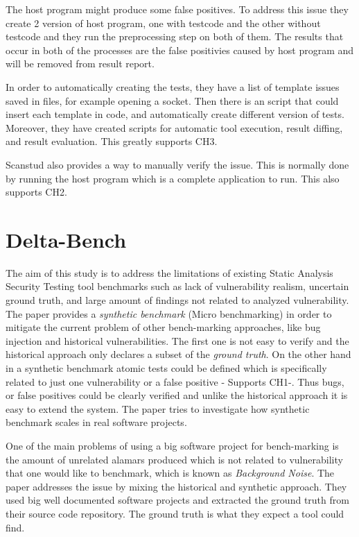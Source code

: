 \documentclass[authoryear,preprint]{sigplanconf}
\begin{document}
The host program might produce some false positives. To address this issue they create 2 version of host program, one with testcode and the other without testcode and they run the preprocessing step on both of them. The results that occur in both of the processes are the false positivies caused by host program and will be removed from result report. 

In order to automatically creating the tests, they have a list of template issues saved in files, for example opening a socket. Then there is an script that could insert each template in code, and automatically create different version of tests. Moreover, they have created scripts for automatic tool execution, result diffing, and result evaluation. This greatly supports CH3.

Scanstud also provides a way to manually verify the issue. This is normally done by running the host program which is a complete application to run. This also supports CH2.

\section{Delta-Bench}
\label{sec:sec_delta}
The aim of this study is to address the limitations of existing Static Analysis Security Testing tool benchmarks such as lack of vulnerability realism, uncertain ground truth, and large amount of findings not related to analyzed vulnerability\cite{8170097}. The paper provides a \textit{synthetic benchmark} (Micro benchmarking) in order to mitigate the current problem of other bench-marking approaches, like bug injection and historical vulnerabilities. The first one is not easy to verify \cite{Dahse:2014:SDS:2671225.2671288} and the historical approach only declares a subset of the \textit{ground truth}. On the other hand in a synthetic benchmark atomic tests could be defined which is specifically related to just one vulnerability or a false positive - Supports CH1-. Thus bugs, or false positives could be clearly verified and unlike the historical approach it is easy to extend the system. The paper tries to investigate how synthetic benchmark scales in real software projects. 

One of the main problems of using a big software project for bench-marking is the amount of unrelated alamars produced which is not related to vulnerability that one would like to benchmark, which is known as \textit{Background Noise}. The paper addresses the issue by mixing the historical and synthetic approach. They used big well documented software projects and extracted the ground truth from their source code repository. The ground truth is what they expect a tool could find.
\end{document}

